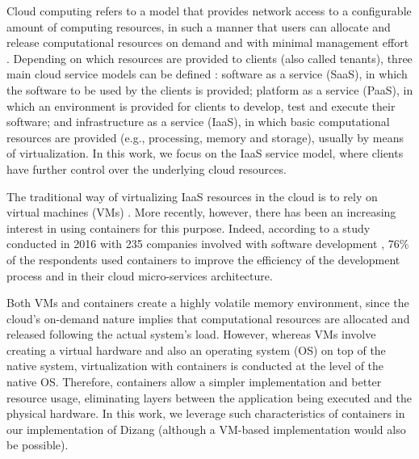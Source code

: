 \documentclass[conference]{IEEEtran}
\newcommand{\marcos}[1]{{\color{blue}{MARCOS: #1}}}
\newcommand{\fancyname}{Dizang }
\begin{document}
Cloud computing refers to a model that provides network access to a configurable amount of computing resources, in such a manner that users can allocate and release computational resources on demand and with minimal management effort \cite{NIST2011}.
%
Depending on which resources are provided to clients (also called tenants), three main cloud service models can be defined \cite{NIST2011}: software as a service (SaaS), in which the software to be used by the clients is provided; platform as a service (PaaS), in which an environment is provided for clients to develop, test and execute their software; and infrastructure as a service (IaaS), in which basic computational resources are provided (e.g., processing, memory and storage), usually by means of virtualization.
%
In this work, we focus on the IaaS service model, where clients have further control over the underlying cloud resources.



The traditional way of virtualizing IaaS resources in the cloud is to rely on virtual machines (VMs) \marcos{CITACAO BEM VINDA: algum trabalho que explica VMs}.
%
More recently, however, there has been an increasing interest in using containers for this purpose.
%
Indeed, according to a study conducted in 2016 with 235 companies involved with software development \cite{container-survey:2016}, 76\% of the respondents used containers to improve the efficiency of the development process and in their cloud micro-services architecture.


Both VMs and containers create a highly volatile memory environment, since the cloud's on-demand nature implies that computational resources are allocated and released following the actual system's load.
%
However, whereas VMs involve creating a virtual hardware and also an operating system (OS) on top of the native system, virtualization with containers is conducted at the level of the native OS.
%
Therefore, containers allow a simpler implementation and better resource usage, eliminating layers between the application being executed and the physical hardware.
%
In this work, we leverage such characteristics of containers in our implementation of \fancyname (although a VM-based implementation would also be possible).


%
\end{document}
